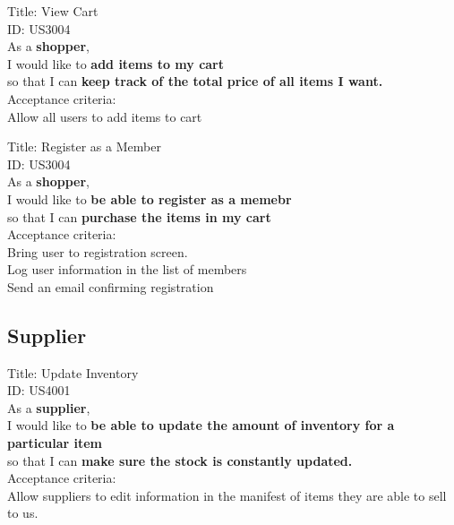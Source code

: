 \documentclass{article}
\begin{document}
\begin{framed}
\noindent
Title: View Cart \\
ID: US3004 \\
As a \textbf{shopper},\\
 \textbullet  \quad \quad I would like to \textbf{add items to my cart}\\ 
 \textbullet  \quad \quad so that I can \textbf{keep track of the total price of all items I want.}\\
 Acceptance criteria: \\
  \textbullet  \quad \quad Allow all users to add items to cart \\
\end{framed}


\begin{framed}
\noindent
Title: Register as a Member\\
ID: US3004 \\
As a \textbf{shopper},\\
 \textbullet  \quad \quad I would like to \textbf{be able to register as a memebr}\\ 
 \textbullet  \quad \quad so that I can \textbf{purchase the items in my cart}\\
 Acceptance criteria: \\
  \textbullet  \quad \quad Bring user to registration screen. \\
  \textbullet  \quad \quad Log user information in the list of members \\
  \textbullet  \quad \quad Send an email confirming registration \\
\end{framed}

\newpage

\subsection{Supplier}

\begin{framed}
\noindent
Title:  Update Inventory \\
ID: US4001 \\
As a \textbf{supplier},\\
 \textbullet  \quad \quad I would like to \textbf{be able to update the amount of inventory for a particular item }\\ 
 \textbullet  \quad \quad so that I can \textbf{make sure the stock is constantly updated.}\\
 Acceptance criteria: \\
  \textbullet  \quad \quad Allow suppliers to edit information in the manifest of items they are able to sell to us.
\end{framed}
\end{document}
